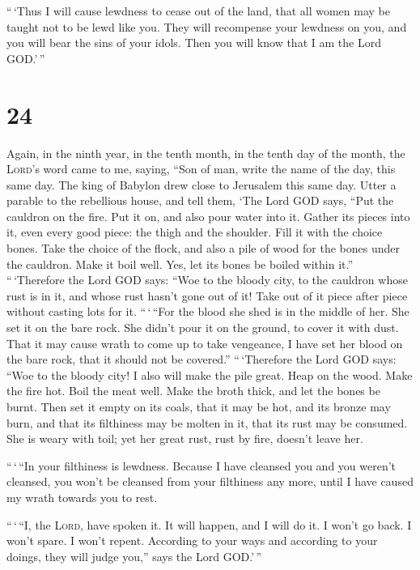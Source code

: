  ``\,`Thus I will cause lewdness to cease out of the
land, that all women may be taught not to be lewd like you.
 They will recompense your lewdness on you, and you will
bear the sins of your idols. Then you will know that I am the Lord
GOD.'\,''

\hypertarget{section-23}{%
\section{24}\label{section-23}}

 Again, in the ninth year, in the tenth month, in the
tenth day of the month, the \textsc{Lord}'s word came to me, saying,
 ``Son of man, write the name of the day, this same day.
The king of Babylon drew close to Jerusalem this same day.
 Utter a parable to the rebellious house, and tell them,
`The Lord GOD says, ``Put the cauldron on the fire. Put it on, and also
pour water into it.  Gather its pieces into it, even every
good piece: the thigh and the shoulder. Fill it with the choice bones.
 Take the choice of the flock, and also a pile of wood for
the bones under the cauldron. Make it boil well. Yes, let its bones be
boiled within it.''  ``\,`Therefore the Lord GOD says:
``Woe to the bloody city, to the cauldron whose rust is in it, and whose
rust hasn't gone out of it! Take out of it piece after piece without
casting lots for it.  ``\,`\,``For the blood she shed is
in the middle of her. She set it on the bare rock. She didn't pour it on
the ground, to cover it with dust.  That it may cause
wrath to come up to take vengeance, I have set her blood on the bare
rock, that it should not be covered.''  ``\,`Therefore the
Lord GOD says: ``Woe to the bloody city! I also will make the pile
great.  Heap on the wood. Make the fire hot. Boil the
meat well. Make the broth thick, and let the bones be burnt.
 Then set it empty on its coals, that it may be hot, and
its bronze may burn, and that its filthiness may be molten in it, that
its rust may be consumed.  She is weary with toil; yet
her great rust, rust by fire, doesn't leave her.

 ``\,`\,``In your filthiness is lewdness. Because I have
cleansed you and you weren't cleansed, you won't be cleansed from your
filthiness any more, until I have caused my wrath towards you to rest.

 ``\,`\,``I, the \textsc{Lord}, have spoken it. It will
happen, and I will do it. I won't go back. I won't spare. I won't
repent. According to your ways and according to your doings, they will
judge you,'' says the Lord GOD.'\,''

